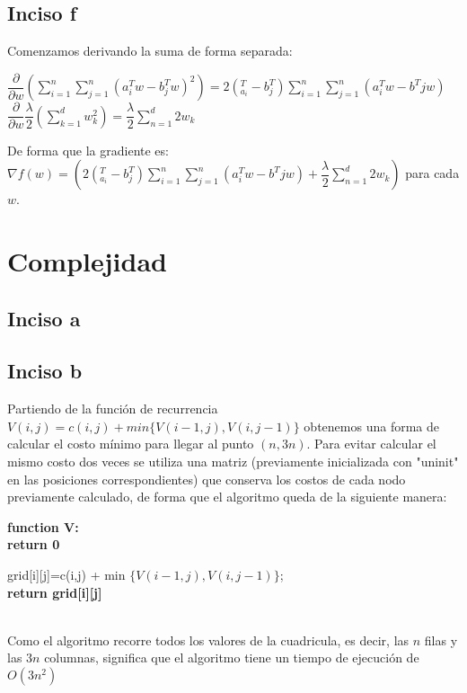 \documentclass[11pt]{article}
\begin{document}
\subsection{Inciso f}
Comenzamos derivando la suma de forma separada:
\begin{center}
$\dfrac{\partial }{\partial w}\left( \sum ^{n}_{i=1}\sum ^{n}_{j=1}\left( a_{i}^{T}w-b_{j}^{T}w \right) ^{2}\right)=2\left( _{a_{i}}^{T}-b_{j}^{T}\right) \sum ^{n}_{i=1}\sum ^{n}_{j=1}\left( a_{i}^{T}w-b^{T}jw\right)$\\
$\dfrac{\partial }{\partial w}\dfrac{\lambda }{2}\left( \sum ^{d}_{k=1}w_{k}^{2}\right) =\dfrac{\lambda }{2}\sum ^{d}_{n=1}2w_{k}$
\end{center}
De forma que la gradiente es:
$\nabla f\left( w\right)=(2\left( _{a_{i}}^{T}-b_{j}^{T}\right) \sum ^{n}_{i=1}\sum ^{n}_{j=1}\left( a_{i}^{T}w-b^{T}jw\right)+\dfrac{\lambda }{2}\sum ^{d}_{n=1}2w_{k})$
para cada $w$.
\pagebreak
\section{Complejidad}
\subsection{Inciso a}
\subsection{Inciso b}
Partiendo de la función de recurrencia $V(i, j) = c(i, j) + min \{V(i-1, j), V(i, j-1)\}$ obtenemos una forma de calcular el costo mínimo para llegar al punto $(n, 3n)$. Para evitar calcular el mismo costo dos veces se utiliza una matriz (previamente inicializada con "uninit" en las posiciones correspondientes) que conserva los costos de cada nodo previamente calculado, de forma que el algoritmo queda de la siguiente manera:
\begin{algorithm}
\textbf{function V:}\\

{
	\textbf{return 0}
}

{
    grid[i][j]=c(i,j) + min $\{V(i-1, j), V(i, j-1)\}$;\\
}
	\textbf{return grid[i][j]}


\end{algorithm}\\
Como el algoritmo recorre todos los valores de la cuadricula, es decir, las $n$ filas y las $3n$ columnas, significa que el algoritmo tiene un tiempo de ejecución de \textbf{$O(3n^{2})$}
\end{document}
